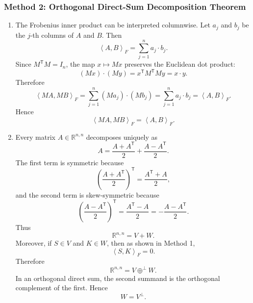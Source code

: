 \documentclass[12pt]{article}
\newcommand{\R}{\mathbb{R}}
\newcommand{\ipF}[2]{\left\langle #1,#2\right\rangle_F}
\newcommand{\T}{\mathsf{T}}
\begin{document}
\subsubsection{Method 2: Orthogonal Direct-Sum Decomposition Theorem}
\begin{enumerate}[label=(\alph*)]
  \item The Frobenius inner product can be interpreted columnwise. Let $a_j$ and $b_j$ be the $j$-th columns of $A$ and $B$. Then
  \[
    \ipF{A}{B}=\sum_{j=1}^n a_j\cdot b_j.
  \]
  Since $M^\T M=I_n$, the map $x\mapsto Mx$ preserves the Euclidean dot product:
  \[
    (Mx)\cdot(My)=x^\T M^\T My=x\cdot y.
  \]
  Therefore
  \[
    \ipF{MA}{MB}
    =\sum_{j=1}^n (Ma_j)\cdot(Mb_j)
    =\sum_{j=1}^n a_j\cdot b_j
    =\ipF{A}{B}.
  \]
  Hence
  \[
    \boxed{\ipF{MA}{MB}=\ipF{A}{B}.}
  \]

  \item Every matrix $A\in\R^{n,n}$ decomposes uniquely as
  \[
    A=\frac{A+A^\T}{2}+\frac{A-A^\T}{2}.
  \]
  The first term is symmetric because
  \[
    \left(\frac{A+A^\T}{2}\right)^\T=\frac{A^\T+A}{2},
  \]
  and the second term is skew-symmetric because
  \[
    \left(\frac{A-A^\T}{2}\right)^\T=\frac{A^\T-A}{2}=-\frac{A-A^\T}{2}.
  \]
  Thus
  \[
    \R^{n,n}=V+W.
  \]
  Moreover, if $S\in V$ and $K\in W$, then as shown in Method 1,
  \[
    \ipF{S}{K}=0.
  \]
  Therefore
  \[
    \R^{n,n}=V\oplus^\perp W.
  \]
  In an orthogonal direct sum, the second summand is the orthogonal complement of the first. Hence
  \[
    \boxed{W=V^\perp.}
  \]
\end{enumerate}

\newpage
\end{document}
